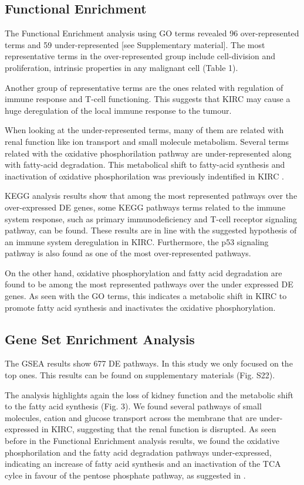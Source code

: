 \documentclass[9pt,twocolumn,twoside]{gsajnl}
\begin{document}
\subsection*{Functional Enrichment}
The Functional Enrichment analysis using GO terms revealed 96 over-represented terms and 59 under-represented [see Supplementary material]. The most representative terms in the over-represented group include cell-division and proliferation, intrinsic properties in any malignant cell (Table 1). 

Another group of representative terms are the ones related with regulation of immune response and T-cell functioning. This suggests that KIRC may cause a huge deregulation of the local immune response to the tumour. 

When looking at the under-represented terms, many of them are related with renal function like ion transport and small molecule metabolism. Several terms related with the oxidative phosphorilation pathway are under-represented along with fatty-acid degradation. This metabolical shift to fatty-acid synthesis and inactivation of oxidative phosphorilation was previously indentified in KIRC \citep{Creighton2013}.

KEGG analysis results show that among the most represented pathways over the over-expressed DE genes, some KEGG pathways terms related to the immune system response, such as primary immunodeficiency and T-cell receptor signaling pathway, can be found.  These results are in line with the suggested hypothesis of an immune system deregulation in KIRC. Furthermore, the p53 signaling pathway is also found as one of the most over-represented pathways.

On the other hand, oxidative phosphorylation and fatty acid degradation are found to be among the most represented pathways over the under expressed DE genes. As seen with the GO terms, this indicates a metabolic shift in KIRC to promote fatty acid synthesis and inactivates the oxidative phosphorylation.

\subsection*{Gene Set Enrichment Analysis}
The GSEA results show 677 DE pathways. In this study we only focused on the top ones. This results can be found on supplementary materials (Fig. S22).

The analysis highlights again the loss of kidney function and the metabolic shift to the fatty acid synthesis  (Fig. 3). We found several pathways of small molecules, cation and glucose transport across the membrane that are under-expressed in KIRC, suggesting that the renal function is disrupted. As seen before in the Functional Enrichment analysis results, we found the oxidative phosphorilation and the fatty acid degradation pathways under-expressed, indicating an increase of fatty acid synthesis and  an inactivation of the TCA cylce in favour of the pentose phosphate pathway, as suggested in \citep{Creighton2013}. 
\end{document}
